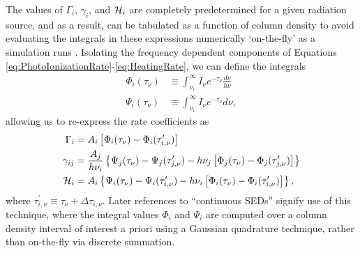 \documentclass[letterpaper,titlepage,12pt]{article}
\numberwithin{equation}{section}
\begin{document}
The values of $\Gamma_i$, $\gamma_i$, and $\mathcal{H}_i$ are completely
predetermined for a given radiation source, and as a result, can be tabulated
as a function of column density to avoid evaluating the
integrals in these expressions numerically `on-the-fly' as a simulation runs
\citep[e.g.][]{Mellema2006,Thomas2008}. Isolating the frequency dependent
components of Equations \ref{eq:PhotoIonizationRate}-\ref{eq:HeatingRate}, we
can define the integrals
\begin{align}
    \Phi_i (\tau_{\nu}) & \equiv \int_{\nu_i}^{\infty} I_{\nu} e^{-\tau_{\nu}} \frac{d\nu}{h\nu} \label{eq:PHI} \\
    \Psi_i (\tau_{\nu}) & \equiv \int_{\nu_i}^{\infty} I_{\nu} e^{-\tau_{\nu}} d\nu \label{eq:PSI},
\end{align}
allowing us to re-express the rate coefficients as
\begin{align}
    \Gamma_i & = A_i \left[\Phi_i(\tau_{\nu}) - \Phi_i(\tau_{i,\nu}^{\prime}) \right] \label{eq:Gamma_PhiPsi} \\
    \gamma_{ij} & = \frac{A_j}{h\nu_i} \left\{\Psi_j(\tau_{\nu}) - \Psi_j(\tau_{j,\nu}^{\prime}) - h \nu_j \left[\Phi_j(\tau_{\nu}) - \Phi_j(\tau_{j,\nu}^{\prime}) \right] \right\}  \label{eq:gamma_PhiPsi} \\
    \mathcal{H}_i & = A_i \left\{\Psi_i(\tau_{\nu}) - \Psi_i(\tau_{i,\nu}^{\prime}) - h\nu_i \left[\Phi_i(\tau_{\nu}) - \Phi_i(\tau_{i,\nu}^{\prime}) \right] \right\} \label{eq:Heat_PhiPsi},  
\end{align}
where $\tau_{i,\nu}^{\prime} \equiv \tau_{\nu} + \Delta \tau_{i, \nu}$. Later
references to ``continuous SEDs'' signify use of this technique, where the
integral values $\Phi_i$ and $\Psi_i$ are computed over a column density
interval of interest a priori using a Gaussian quadrature technique, rather
than on-the-fly via discrete summation.
\end{document}
